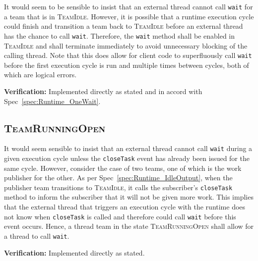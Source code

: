 \documentclass{article}
\newcommand{\TeamIdle}          {\textsc{TeamIdle}}
\newcommand{\TeamRunningOpen}   {\textsc{TeamRunningOpen}}
\begin{document}
\begin{spec}
It would seem to be sensible to insist that an external thread cannot call
\texttt{wait} for a team that is in \TeamIdle.  However, it is possible that a
runtime execution cycle could finish and transition a team back to {\TeamIdle}
before an external thread has the chance to call \texttt{wait}.  Therefore, the
\texttt{wait} method shall be enabled in {\TeamIdle} and shall terminate immediately to avoid
unnecessary blocking of the calling thread.  Note that this does allow for
client code to superfluously call \texttt{wait} before the first execution cycle
is run and multiple times between cycles, both of which are logical errors.
\end{spec}
\textbf{Verification:}\hspace{0.125in}  Implemented directly as stated and in
accord with Spec~\ref{spec:Runtime_OneWait}.  

\subsection{\TeamRunningOpen}
\begin{spec}
It  would seem sensible to insist that an external thread cannot call
\texttt{wait} during a given execution cycle unless the \texttt{closeTask} event
has already been issued for the same cycle.  However, consider the case of two
teams, one of which is the work publisher for the other.  As per
Spec~\ref{spec:Runtime_IdleOutput}, when the publisher team transitions to
{\TeamIdle}, it calls the subscriber's \texttt{closeTask} method to inform the
subscriber that it will not be given more work.  This implies that the external
thread that triggers an execution cycle with the runtime does not know when
\texttt{closeTask} is called and therefore could call \texttt{wait} before this
event occurs.  Hence, a thread team in the state {\TeamRunningOpen} shall allow
for a thread to call \texttt{wait}.
\end{spec}
\textbf{Verification:}\hspace{0.125in}  Implemented directly as stated.

\end{document}
